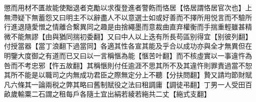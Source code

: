 懲而用材不匱故能使黜退者克勵以求復登進者警飭而恪居【恪居謂恪居官次也】上無滯疑下無蓄怨又曰明主不以辭盡人不以意選士如或好善而不擇所用悦言而不驗所行進退隨愛憎之情離合繫異同之趣是由捨繩墨而意裁曲直弃權衡而手揣重輕雖甚精微不能無謬【由與猶同揣初委翻】又曰中人以上迭有所長苟區别得宜【别彼列翻】付授當器【當丁浪翻下過當同】各適其性各宣其能及乎合以成功亦與全才無異但在明鑒大度御之有道而已又曰以一言稱愜為能【愜苦叶翻】而不核虛實以一事違忤為咎而不考忠邪【忤五故翻】其稱愜則付任逾涯不思其所不及其違忤則罪責過當不恕其所不能是以職司之内無成功君臣之際無定分上不聽【分扶問翻】贄又請均節財賦凡六條其一論兩税之弊其略曰舊制賦役之法曰租調庸【調徒弔翻】丁男一人受田百畝歲輸粟二石謂之租每戶各隨土宜出絹若綾若絁共二丈【絁式支翻】